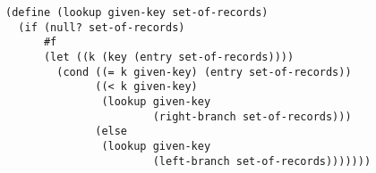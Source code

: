\documentclass[a4paper,12pt]{article}
\begin{document}
\begin{lstlisting}
(define (lookup given-key set-of-records)
  (if (null? set-of-records)
      #f
      (let ((k (key (entry set-of-records))))
        (cond ((= k given-key) (entry set-of-records))
              ((< k given-key)
               (lookup given-key
                       (right-branch set-of-records)))
              (else
               (lookup given-key
                       (left-branch set-of-records)))))))
\end{lstlisting}
\end{document}
